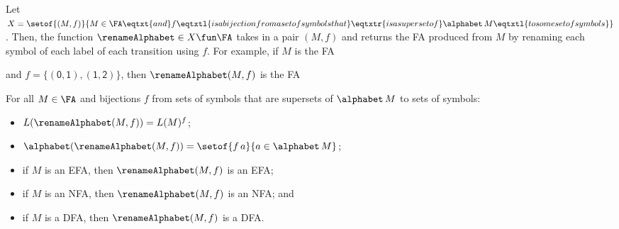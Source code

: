 Let $X=\setof{(M,f)}{M\in\FA\eqtxt{and}f\eqtxtl{is a
bijection from a set of symbols that}\eqtxtr{is a superset
of}\alphabet\,M\eqtxtl{to some set of symbols}}$.
Then, the function $\renameAlphabet\in X\fun\FA$ takes in a pair $(M,f)$ and
%
%
%
%
%
%
%
%
%
returns the FA produced from $M$ by renaming each symbol of each
label of each transition using $f$.
For example, if $M$ is the FA
\begin{center}

\end{center}
and $f=\{\mathsf{(0,1), (1,2)}\}$, then
$\renameAlphabet(M,f)$ is the FA
\begin{center}

\end{center}

\begin{theorem}
For all $M\in\FA$ and bijections $f$ from sets of symbols that
are supersets of $\alphabet\,M$ to sets of symbols:
\begin{itemize}
\item $L(\renameAlphabet(M,f)) = L(M)^f$;

\item $\alphabet(\renameAlphabet(M,f)) =
\setof{f\,a}{a\in\alphabet\,M}$;

\item if $M$ is an EFA, then $\renameAlphabet(M,f)$ is an EFA;

\item if $M$ is an NFA, then $\renameAlphabet(M,f)$ is an NFA; and

\item if $M$ is a DFA, then $\renameAlphabet(M,f)$ is a DFA.
\end{itemize}
\end{theorem}

